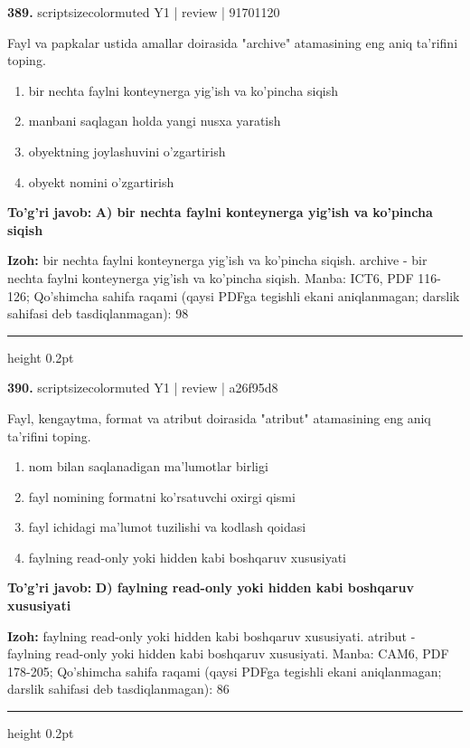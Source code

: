 \documentclass[10pt,a4paper]{article}
\begin{document}
{\bfseries\sffamily\color{ink} 389.} {scriptsizecolor{muted} Y1 | review | 91701120}
\par
Fayl va papkalar ustida amallar doirasida "archive" atamasining eng aniq ta'rifini toping.
\begin{enumerate}[label=\Alph*),leftmargin=9mm]
\item bir nechta faylni konteynerga yig'ish va ko'pincha siqish
\item manbani saqlagan holda yangi nusxa yaratish
\item obyektning joylashuvini o'zgartirish
\item obyekt nomini o'zgartirish
\end{enumerate}
\begin{tcolorbox}[enhanced,breakable,colback=teal!4,colframe=teal!60!black,boxrule=0.45pt,arc=1.2mm,left=2.7mm,right=2.7mm,top=1.8mm,bottom=1.8mm,before skip=2mm,after skip=2mm]
{\bfseries\sffamily\color{teal}To'g'ri javob:} \textbf{A) bir nechta faylni konteynerga yig'ish va ko'pincha siqish}
\par\smallskip
{\bfseries Izoh:} bir nechta faylni konteynerga yig'ish va ko'pincha siqish. archive - bir nechta faylni konteynerga yig'ish va ko'pincha siqish. Manba: ICT6, PDF 116-126; Qo'shimcha sahifa raqami (qaysi PDFga tegishli ekani aniqlanmagan; darslik sahifasi deb tasdiqlanmagan): 98
\end{tcolorbox}
\vspace{2mm}\hrule height 0.2pt\vspace{3mm}

{\bfseries\sffamily\color{ink} 390.} {scriptsizecolor{muted} Y1 | review | a26f95d8}
\par
Fayl, kengaytma, format va atribut doirasida "atribut" atamasining eng aniq ta'rifini toping.
\begin{enumerate}[label=\Alph*),leftmargin=9mm]
\item nom bilan saqlanadigan ma'lumotlar birligi
\item fayl nomining formatni ko'rsatuvchi oxirgi qismi
\item fayl ichidagi ma'lumot tuzilishi va kodlash qoidasi
\item faylning read-only yoki hidden kabi boshqaruv xususiyati
\end{enumerate}
\begin{tcolorbox}[enhanced,breakable,colback=teal!4,colframe=teal!60!black,boxrule=0.45pt,arc=1.2mm,left=2.7mm,right=2.7mm,top=1.8mm,bottom=1.8mm,before skip=2mm,after skip=2mm]
{\bfseries\sffamily\color{teal}To'g'ri javob:} \textbf{D) faylning read-only yoki hidden kabi boshqaruv xususiyati}
\par\smallskip
{\bfseries Izoh:} faylning read-only yoki hidden kabi boshqaruv xususiyati. atribut - faylning read-only yoki hidden kabi boshqaruv xususiyati. Manba: CAM6, PDF 178-205; Qo'shimcha sahifa raqami (qaysi PDFga tegishli ekani aniqlanmagan; darslik sahifasi deb tasdiqlanmagan): 86
\end{tcolorbox}
\vspace{2mm}\hrule height 0.2pt\vspace{3mm}
\end{document}
